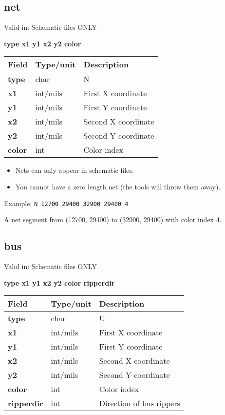 \documentclass{article}
\begin{document}
\subsection{net}

Valid in: Schematic files ONLY

{\bf type x1 y1 x2 y2 color}

\begin{table}[h]
\begin{tabular}{|l|l|l|} \hline
Field 		& Type/unit 	& Description \\ \hline 
\hline
{\bf type} 	& char 		& N \\ \hline
{\bf x1} 	& int/mils	& First X coordinate \\ \hline
{\bf y1} 	& int/mils	& First Y coordinate \\ \hline
{\bf x2} 	& int/mils	& Second X coordinate \\ \hline
{\bf y2} 	& int/mils	& Second Y coordinate \\ \hline
{\bf color} 	& int		& Color index \\ \hline
\end{tabular}
\end{table}

\begin{itemize}
\item Nets can only appear in schematic files.
\item You cannot have a zero length net (the tools will throw them away).
\end{itemize}

Example:\newline
{\tt N 12700 29400 32900 29400 4}

A net segment from (12700, 29400) to (32900, 29400) with color index 4.

\subsection{bus}

Valid in: Schematic files ONLY

{\bf type x1 y1 x2 y2 color ripperdir}

\begin{table}[h]
\begin{tabular}{|l|l|l|} \hline
Field 		& Type/unit 	& Description \\ \hline 
\hline
{\bf type} 	& char		& U \\ \hline
{\bf x1} 	& int/mils 	& First X coordinate \\ \hline
{\bf y1} 	& int/mils	& First Y coordinate \\ \hline
{\bf x2} 	& int/mils	& Second X coordinate \\ \hline
{\bf y2} 	& int/mils	& Second Y coordinate \\ \hline
{\bf color} 	& int		& Color index \\ \hline
{\bf ripperdir} & int 		& Direction of bus rippers \\ \hline
\end{tabular}
\end{table}
\end{document}
